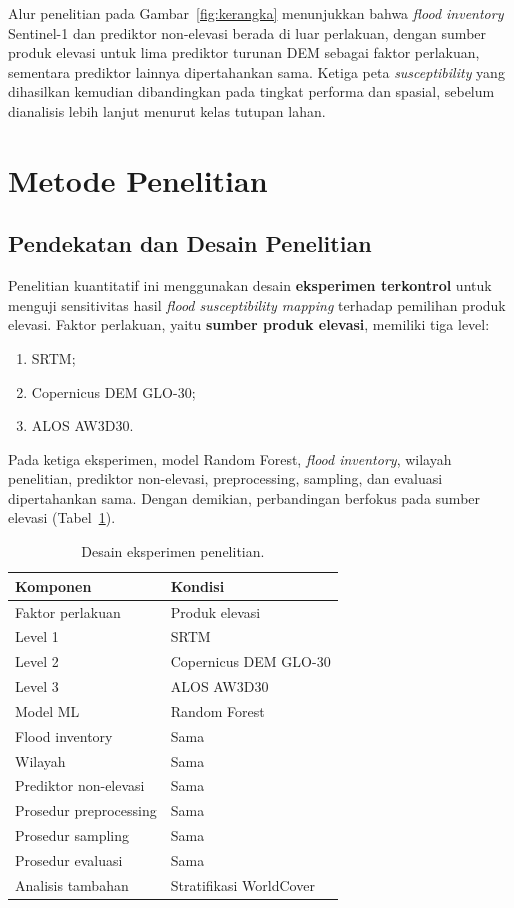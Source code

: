\documentclass[12pt]{article}
\begin{document}
Alur penelitian pada Gambar~\ref{fig:kerangka} menunjukkan bahwa
\textit{flood inventory} Sentinel-1 dan prediktor non-elevasi berada di luar
perlakuan, dengan sumber produk elevasi untuk lima prediktor turunan DEM
sebagai faktor perlakuan, sementara prediktor lainnya dipertahankan sama.
Ketiga peta \textit{susceptibility} yang dihasilkan kemudian
dibandingkan pada tingkat performa dan spasial, sebelum dianalisis lebih
lanjut menurut kelas tutupan lahan.


\clearpage
\section{Metode Penelitian}

\subsection{Pendekatan dan Desain Penelitian}

Penelitian kuantitatif ini menggunakan desain
\textbf{eksperimen terkontrol} untuk menguji sensitivitas hasil
\textit{flood susceptibility mapping} terhadap pemilihan produk elevasi.
Faktor perlakuan, yaitu \textbf{sumber produk elevasi}, memiliki tiga level:

\begin{enumerate}
\item SRTM;
\item Copernicus DEM GLO-30;
\item ALOS AW3D30.
\end{enumerate}

Pada ketiga eksperimen, model Random Forest, \textit{flood inventory},
wilayah penelitian, prediktor non-elevasi, preprocessing, sampling, dan
evaluasi dipertahankan sama. Dengan demikian, perbandingan berfokus pada
sumber elevasi (Tabel~\ref{tab:desain}).

\begin{table}[ht]
\centering
\caption{Desain eksperimen penelitian.}
\label{tab:desain}
\begin{tabular}{ll}
\toprule
\textbf{Komponen} & \textbf{Kondisi} \\
\midrule
Faktor perlakuan & Produk elevasi \\
Level 1 & SRTM \\
Level 2 & Copernicus DEM GLO-30 \\
Level 3 & ALOS AW3D30 \\
Model ML & Random Forest \\
Flood inventory & Sama \\
Wilayah & Sama \\
Prediktor non-elevasi & Sama \\
Prosedur preprocessing & Sama \\
Prosedur sampling & Sama \\
Prosedur evaluasi & Sama \\
Analisis tambahan & Stratifikasi WorldCover \\
\bottomrule
\end{tabular}
\end{table}
\end{document}
